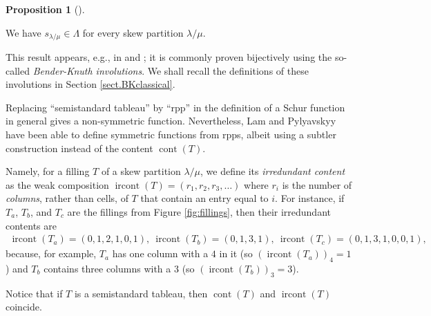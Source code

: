 \documentclass[numbers=enddot,12pt,final,onecolumn,notitlepage]{scrartcl}%
\theoremstyle{definition}
\newtheorem{prop}[theo]{Proposition}
\newenvironment{proposition}[1][]
{\begin{prop}[#1]\begin{leftbar}}
{\end{leftbar}\end{prop}}
\def\ircont{{\operatorname{ircont}}}
\def\cont{{\operatorname{cont}}}
\def\lm{{\lambda/\mu}}
\begin{document}
 
\begin{proposition}
\label{prop.schur.symm}We have $s_{\lambda/\mu}\in\Lambda$ for every skew
partition $\lambda/\mu$.
\end{proposition}

This result appears, e.g., in \cite[Theorem 7.10.2]{Stan99} and
\cite[Proposition 2.11]{GriRei15}; it is commonly proven bijectively using the
so-called \textit{Bender-Knuth involutions}. We shall recall the definitions
of these involutions in Section \ref{sect.BKclassical}.


 Replacing ``semistandard
tableau'' by ``rpp'' in the
definition of a Schur function in general gives a non-symmetric function. Nevertheless, Lam
and Pylyavskyy \cite[\S 9]{LamPyl} have been able to define
symmetric functions from rpps, albeit using a subtler construction
instead of the content $\operatorname{cont}\left(  T\right)$.



  Namely, for a filling $T$ of a skew partition $\lm$, we define its
\textit{irredundant content} as the weak composition $\operatorname*{ircont}\left(
T\right) = \left(r_1,r_2,r_3,\dots\right)$ where $r_i$ is the number of \emph{columns}, rather than cells, of $T$ that contain an entry equal to $i$. For instance, if $T_a$, $T_b$, and $T_c$ are the fillings from Figure \ref{fig:fillings}, then their irredundant contents are
\begin{align*}
\ircont(T_a)=(0,1,2,1,0,1),\ \ircont(T_b)=(0,1,3,1),\ \ircont(T_c)=(0,1,3,1,0,0,1),
\end{align*}
because, for example, $T_a$ has one column with a $4$ in it (so $(\ircont(T_a))_4=1$) and $T_b$ contains three columns with a $3$ (so $(\ircont(T_b))_3=3$).

Notice that if $T$ is a semistandard tableau, then $\cont(T)$ and $\ircont(T)$ coincide.
\end{document}
